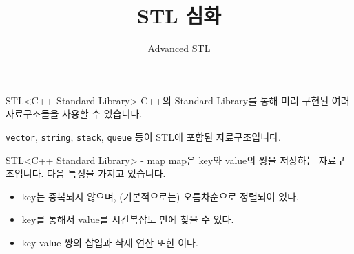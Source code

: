 

\title{STL 심화}
\subtitle{Advanced STL}



\frame{\titlepage}

\begin{frame}{STL}{<C++ Standard Library>}
  \vspace{8mm}
  C++의 Standard Library를 통해 미리 구현된 여러 자료구조들을 사용할 수 있습니다.\par\vspace{3mm}
  \texttt{vector}, \texttt{string}, \texttt{stack}, \texttt{queue} 등이 STL에 포함된
  자료구조입니다.\par\vspace{5mm}
\end{frame}


\begin{frame}{STL}{<C++ Standard Library> - map}
  \vspace{6mm}
  \alert{map}은 key와 value의 쌍을 저장하는 자료구조입니다. 다음 특징을 가지고 있습니다.
  \vspace{4mm}
  \begin{itemize}
    \item key는 중복되지 않으며, (기본적으로는) 오름차순으로 정렬되어 있다.
    \item key를 통해서 value를 시간복잡도  만에 찾을 수 있다.
    \item key-value 쌍의 삽입과 삭제 연산 또한 이다.
  \end{itemize}
\end{frame}

